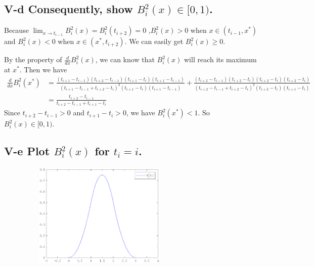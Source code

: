 \documentclass[twoside,a4paper]{article}
\begin{document}
\subsection*{V-d \small{Consequently, show $B^{2}_{i}\left( x \right)\in[0,1) $.}}

Because $\lim_{x\to t_{i-1}}B^{2}_{i}\left( x \right)=B^{2}_{i}\left( t_{i+2} \right)=0  $ 
,$B^{2}_{i}\left( x \right) >0$ when $x\in\left( t_{i-1} ,x^{*}\right) $ and  $B^{2}_{i}\left( x \right) <0$ when $x\in\left(x^{*},t_{i+2}\right)$. We can easily get $B^{2}_{i}\left( x \right)\ge 0 $.

By the property of $\frac{d}{dx}B^{2}_{i}\left( x \right) $, we can know that $B^{2}_{i}\left( x \right) $ will reach its maximum
at $x^{*}$. Then we have
\begin{equation*}
	\begin{split}
		\frac{d}{dx}B^{2}_{i}\left( x^{*} \right)
		&=\frac{\left( t_{i+1}-t_{i-1}\right)\left( t_{i+2}-t_{i-1} \right)\left( t_{i+1}-t_{i} \right)\left( t_{i+1}-t_{i-1} \right)}
		{\left( t_{i+1}-t_{i-1}+t_{i+2}-t_{i} \right)^2\left( t_{i+1}-t_{i} \right)\left( t_{i+1}-t_{i-1} \right)   } +
		\frac{\left( t_{i+2}-t_{i-1} \right)\left( t_{i+2}-t_{i} \right)\left( t_{i+2}-t_{i} \right)\left( t_{i+2}-t_{i} \right)    }
		{\left( t_{i+2}-t_{i-1}+t_{i+2}-t_{i} \right)^2\left( t_{i+2}-t_{i} \right)\left( t_{i+1}-t_{i} \right)   }\\
		&=\frac{t_{i+2}-t_{i-1}}{t_{i+2}-t_{i-1}+t_{i+1}-t_{i}}
	\end{split}
\end{equation*}
Since $t_{i+2}-t_{i-1}>0$ and $t_{i+1}-t_{i}>0$, we have $B^{2}_{i}\left( x^{*} \right)<1 $.
So $B^{2}_{i}\left( x \right) \in[0,1)$.

\subsection*{V-e \small{Plot $B_{i}^{2}\left( x \right) $ for $t_{i}=i$.}}

\begin{center}
\includegraphics[width=10cm, height=5cm]{Plot.eps}
\end{center}
\end{document}
